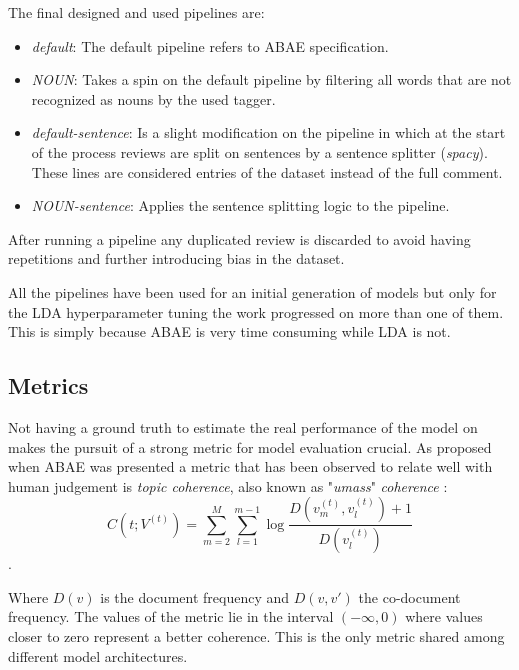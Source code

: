 The final designed and used pipelines are:
\begin{itemize}
    \item {\textit{default}}: The default pipeline refers to ABAE specification.

    \item {\textit{NOUN}}: Takes a spin on the default pipeline by filtering all words that are not recognized as nouns
    by the used tagger. %

    \item {\textit{default-sentence}}: Is a slight modification on the  pipeline in which
    at the start of the process reviews are split on sentences by a sentence splitter (\textit{spacy}).
    These lines are considered entries of the dataset instead of the full comment.

    \item {\textit{NOUN-sentence}}: Applies the sentence splitting logic to the  pipeline.
\end{itemize}

After running a pipeline any duplicated review is discarded to avoid having repetitions and further introducing
bias in the dataset.

All the pipelines have been used for an initial generation of models but only for the LDA hyperparameter
tuning the work progressed on more than one of them. This is simply because ABAE is very time consuming while LDA is not.

\subsection{Metrics}
Not having a ground truth to estimate the real performance of the model on makes the pursuit of a strong metric
for model evaluation crucial.
As proposed when ABAE was presented \cite{he-etal-2017-unsupervised} a metric that has been observed to relate
well with human judgement is \textit{topic coherence}, also known as "\textit{umass}" \textit{coherence} \cite{mimno-etal-2011-optimizing}:
$$C(t;V^{(t)}) = \sum^M_{m=2} \sum^{m-1}_{l=1} \log \frac{D(v_m^{(t)}, v_l^{(t)}) + 1}{D(v_l^{(t)})} $$.

Where $D(v)$ is the document frequency and $D(v,v')$ the co-document frequency.
The values of the metric lie in the interval $(-\infty, 0)$ where values closer to zero represent a better coherence.
This is the only metric shared among different model architectures.


